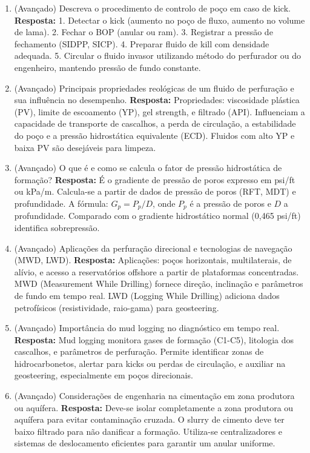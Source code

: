 \documentclass[11pt,a4paper]{article}
\begin{document}
\begin{enumerate}
  \item (Avançado) Descreva o procedimento de controlo de poço em caso de kick.
  \textbf{Resposta:} 1. Detectar o kick (aumento no poço de fluxo, aumento no volume de lama). 2. Fechar o BOP (anular ou ram). 3. Registrar a pressão de fechamento (SIDPP, SICP). 4. Preparar fluido de kill com densidade adequada. 5. Circular o fluido invasor utilizando método do perfurador ou do engenheiro, mantendo pressão de fundo constante.

  \item (Avançado) Principais propriedades reológicas de um fluido de perfuração e sua influência no desempenho.
  \textbf{Resposta:} Propriedades: viscosidade plástica (PV), limite de escoamento (YP), gel strength, e filtrado (API). Influenciam a capacidade de transporte de cascalhos, a perda de circulação, a estabilidade do poço e a pressão hidrostática equivalente (ECD). Fluidos com alto YP e baixa PV são desejáveis para limpeza.

  \item (Avançado) O que é e como se calcula o fator de pressão hidrostática de formação?
  \textbf{Resposta:} É o gradiente de pressão de poros expresso em psi/ft ou kPa/m. Calcula-se a partir de dados de pressão de poros (RFT, MDT) e profundidade. A fórmula: $G_p = P_p / D$, onde $P_p$ é a pressão de poros e $D$ a profundidade. Comparado com o gradiente hidrostático normal (0,465 psi/ft) identifica sobrepressão.

  \item (Avançado) Aplicações da perfuração direcional e tecnologias de navegação (MWD, LWD).
  \textbf{Resposta:} Aplicações: poços horizontais, multilaterais, de alívio, e acesso a reservatórios offshore a partir de plataformas concentradas. MWD (Measurement While Drilling) fornece direção, inclinação e parâmetros de fundo em tempo real. LWD (Logging While Drilling) adiciona dados petrofísicos (resistividade, raio-gama) para geosteering.

  \item (Avançado) Importância do mud logging no diagnóstico em tempo real.
  \textbf{Resposta:} Mud logging monitora gases de formação (C1-C5), litologia dos cascalhos, e parâmetros de perfuração. Permite identificar zonas de hidrocarbonetos, alertar para kicks ou perdas de circulação, e auxiliar na geosteering, especialmente em poços direcionais.

  \item (Avançado) Considerações de engenharia na cimentação em zona produtora ou aquífera.
  \textbf{Resposta:} Deve-se isolar completamente a zona produtora ou aquífera para evitar contaminação cruzada. O slurry de cimento deve ter baixo filtrado para não danificar a formação. Utiliza-se centralizadores e sistemas de deslocamento eficientes para garantir um anular uniforme.


\end{enumerate}
\end{document}
